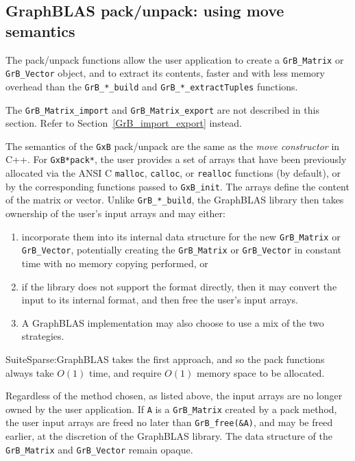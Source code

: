 \documentclass[12pt]{article}
\begin{document}
{\subsection{GraphBLAS pack/unpack: using move semantics} %
\label{pack_unpack}

The pack/unpack functions allow the user application to create a
\verb'GrB_Matrix' or \verb'GrB_Vector' object, and to extract its contents,
faster and with less memory overhead than the \verb'GrB_*_build' and
\verb'GrB_*_extractTuples' functions.

The \verb'GrB_Matrix_import' and \verb'GrB_Matrix_export' are not
described in this section.  Refer to Section~\ref{GrB_import_export} instead.

The semantics of the \verb'GxB' pack/unpack are the same as the
{\em move constructor} in C++.  For \verb'GxB*pack*', the user provides a set of
arrays that have been previously allocated via the ANSI C \verb'malloc',
\verb'calloc', or \verb'realloc' functions (by default), or by the
corresponding functions passed to \verb'GxB_init'.  The arrays define the
content of the matrix or vector.  Unlike \verb'GrB_*_build', the GraphBLAS
library then takes ownership of the user's input arrays and may either:

\begin{enumerate}
\item incorporate them
into its internal data structure for the new \verb'GrB_Matrix' or
\verb'GrB_Vector', potentially creating the \verb'GrB_Matrix' or
\verb'GrB_Vector' in constant time with no memory copying performed, or
\item if
the library does not support the format directly, then it may convert
the input to its internal format, and then free the user's input arrays.
\item A
GraphBLAS implementation may also choose to use a mix of the two strategies.
\end{enumerate}

SuiteSparse:GraphBLAS takes the first approach, and so the pack
functions always take $O(1)$ time, and require $O(1)$ memory space to be
allocated.

Regardless of the method chosen, as listed above, the input arrays are no
longer owned by the user application.  If \verb'A' is a \verb'GrB_Matrix'
created by a pack method, the user input arrays are freed no later than
\verb'GrB_free(&A)', and may be freed earlier, at the discretion of the
GraphBLAS library.  The data structure of the \verb'GrB_Matrix' and
\verb'GrB_Vector' remain opaque.

}
\end{document}
